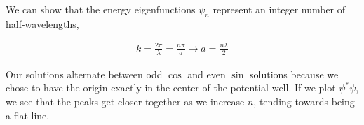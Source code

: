 \documentclass[11pt]{amsart}
\begin{document}
We can show that the energy eigenfunctions $\psi_n$ represent an integer number of half-wavelengths,

\begin{align*}
  k = \frac{2\pi}{\lambda} = \frac{n\pi}{a} \to a = \frac{n\lambda}{2}
\end{align*}

Our solutions alternate between odd $\cos$ and even $\sin$ solutions because we chose to have the origin exactly in the center of the potential well. If we plot $\psi^*\psi$, we see that the peaks get closer together as we increase $n$, tending towards being a flat line.
\end{document}

